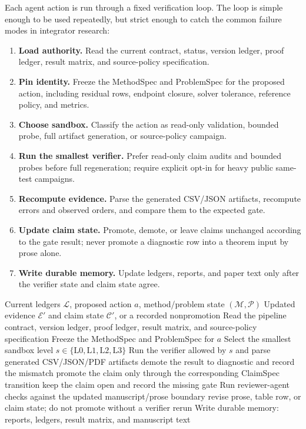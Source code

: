 \documentclass[10pt]{article}
\begin{document}
Each agent action is run through a fixed verification loop. The loop is simple
enough to be used repeatedly, but strict enough to catch the common failure
modes in integrator research:
\begin{enumerate}
  \item \textbf{Load authority.} Read the current contract, status, version
  ledger, proof ledger, result matrix, and source-policy specification.
  \item \textbf{Pin identity.} Freeze the MethodSpec and ProblemSpec for the
  proposed action, including residual rows, endpoint closure, solver tolerance,
  reference policy, and metrics.
  \item \textbf{Choose sandbox.} Classify the action as read-only validation,
  bounded probe, full artifact generation, or source-policy campaign.
  \item \textbf{Run the smallest verifier.} Prefer read-only claim audits and
  bounded probes before full regeneration; require explicit opt-in for heavy
  public same-test campaigns.
  \item \textbf{Recompute evidence.} Parse the generated CSV/JSON artifacts,
  recompute errors and observed orders, and compare them to the expected gate.
  \item \textbf{Update claim state.} Promote, demote, or leave claims unchanged
  according to the gate result; never promote a diagnostic row into a theorem
  input by prose alone.
  \item \textbf{Write durable memory.} Update ledgers, reports, and paper text
  only after the verifier state and claim state agree.
\end{enumerate}

\begin{algorithm}[H]
\caption{Verifier-centered research step}
\label{alg:research_step}
\begin{algorithmic}[1]
\Require Current ledgers $\mathcal{L}$, proposed action $a$, method/problem state $(\mathcal{M},\mathcal{P})$
\Ensure Updated evidence $\mathcal{E}'$ and claim state $\mathcal{C}'$, or a recorded nonpromotion
\State Read the pipeline contract, version ledger, proof ledger, result matrix, and source-policy specification
\State Freeze the MethodSpec and ProblemSpec for $a$
\State Select the smallest sandbox level $s \in \{\mathrm{L0},\mathrm{L1},\mathrm{L2},\mathrm{L3}\}$
\State Run the verifier allowed by $s$ and parse generated CSV/JSON/PDF artifacts
  \State demote the result to diagnostic and record the mismatch
  \State promote the claim only through the corresponding ClaimSpec transition
\Else
  \State keep the claim open and record the missing gate
\EndIf
\State Run reviewer-agent checks against the updated manuscript/prose boundary
  \State revise prose, table row, or claim state; do not promote without a verifier rerun
\EndIf
\State Write durable memory: reports, ledgers, result matrix, and manuscript text
\end{algorithmic}
\end{algorithm}
\end{document}
